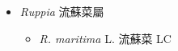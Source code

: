 
  \begin{itemize}
 \item[] \textit{Ruppia} 流蘇菜屬
                                
  \begin{itemize}
        \item[] \textit{R. maritima} L.  流蘇菜   LC
  \end{itemize}
  \end{itemize}
